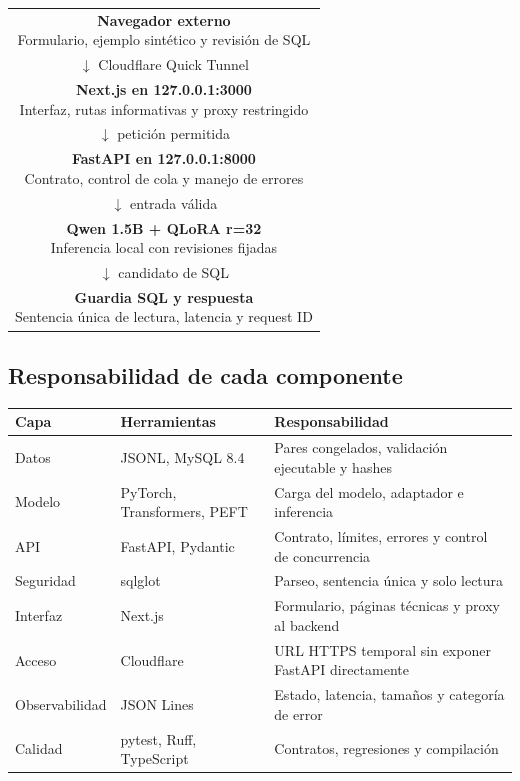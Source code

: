 \documentclass[11pt,letterpaper]{article}
\begin{document}
\begin{center}
\begin{tabular}{c}
\fcolorbox{teal}{paper}{\parbox{.82\textwidth}{\centering
\textbf{Navegador externo}\\Formulario, ejemplo sintético y revisión de SQL}}\\[.35em]
$\downarrow$ Cloudflare Quick Tunnel\\[.35em]
\fcolorbox{teal}{paper}{\parbox{.82\textwidth}{\centering
\textbf{Next.js en 127.0.0.1:3000}\\Interfaz, rutas informativas y proxy restringido}}\\[.35em]
$\downarrow$ petición permitida\\[.35em]
\fcolorbox{teal}{paper}{\parbox{.82\textwidth}{\centering
\textbf{FastAPI en 127.0.0.1:8000}\\Contrato, control de cola y manejo de errores}}\\[.35em]
$\downarrow$ entrada válida\\[.35em]
\fcolorbox{teal}{paper}{\parbox{.82\textwidth}{\centering
\textbf{Qwen 1.5B + QLoRA r=32}\\Inferencia local con revisiones fijadas}}\\[.35em]
$\downarrow$ candidato de SQL\\[.35em]
\fcolorbox{teal}{paper}{\parbox{.82\textwidth}{\centering
\textbf{Guardia SQL y respuesta}\\Sentencia única de lectura, latencia y request ID}}
\end{tabular}
\end{center}

\subsection{Responsabilidad de cada componente}

\begin{tabularx}{\textwidth}{@{}lXX@{}}
\toprule
\textbf{Capa} & \textbf{Herramientas} & \textbf{Responsabilidad}\\
\midrule
Datos & JSONL, MySQL 8.4 & Pares congelados, validación ejecutable y hashes\\
Modelo & PyTorch, Transformers, PEFT & Carga del modelo, adaptador e inferencia\\
API & FastAPI, Pydantic & Contrato, límites, errores y control de concurrencia\\
Seguridad & sqlglot & Parseo, sentencia única y solo lectura\\
Interfaz & Next.js & Formulario, páginas técnicas y proxy al backend\\
Acceso & Cloudflare & URL HTTPS temporal sin exponer FastAPI directamente\\
Observabilidad & JSON Lines & Estado, latencia, tamaños y categoría de error\\
Calidad & pytest, Ruff, TypeScript & Contratos, regresiones y compilación\\
\bottomrule
\end{tabularx}
\end{document}
